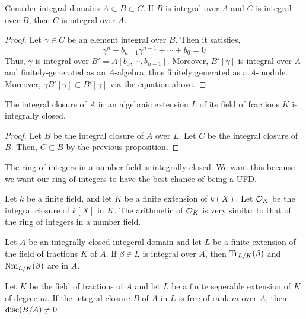 \documentclass[12pt]{amsart}
\begin{document}
\begin{proposition}
    Consider integral domains $A \subset B \subset C$. If $B$ is integral over $A$ and $C$ is integral over $B$, then $C$ is integral over $A$. 
\end{proposition}
\begin{proof}
    Let $\gamma \in C$ be an element integral over $B$. Then it satisfies, 
    \[ \gamma^n + b_{n-1}\gamma^{n-1} + \cdots + b_0 = 0\]
    Thus, $\gamma$ is integral over $B' = A[b_0, \cdots, b_{n-1}]$. Moreover, $B'[\gamma]$ is integral over $A$ and finitely-generated as an $A$-algebra, thus finitely generated as a $A$-module. Moreover, $\gamma B'[\gamma] \subset B'[\gamma]$ via the equation above. 
\end{proof}

\begin{corollary}
    The integral closure of $A$ in an algebraic extension $L$ of its field of fractions $K$ is integrally closed. 
\end{corollary}
\begin{proof}
    Let $B$ be the integral closure of $A$ over $L$. Let $C$ be the integral closure of $B$. Then, $C \subset B$ by the previous proposition.  
\end{proof}

\begin{remark}
    The ring of integers in a number field is integrally closed. We want this because we want our ring of integers to have the best chance of being a UFD. 
\end{remark}

\begin{example}
    Let $k$ be a finite field, and let $K$ be a finite extension of $k(X)$. Let $\mathcal{O}_K$ be the integral closure of $k[X]$ in $K$. The arithmetic of $\mathcal{O}_K$ is very similar to that of the ring of integers in a number field.
\end{example}

\begin{proposition}
    Let $A$ be an integrally closed integeral domain and let $L$ be a finite extension of the field of fractions $K$ of $A$. If $\beta \in L$ is integral over $A$, then $\operatorname{Tr}_{L/K}(\beta)$ and $\operatorname{Nm}_{L/K}(\beta)$ are in $A$.
\end{proposition} 

\begin{proposition}
    Let $K$ be the field of fractions of $A$ and let $L$ be a finite seperable extension of $K$ of degree $m$. If the integral closure $B$ of $A$ in $L$ is free of rank $m$ over $A$, then $\operatorname{disc}(B/A) \neq 0$. 
\end{proposition}
\end{document}
